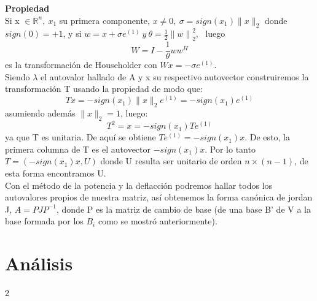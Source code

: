 \documentclass[12pt,a4paper]{article}
\begin{document}
\begin{multicols}{2}
\noindent\textbf{Propiedad}\\
\noindent Si x $\in\mathbb{R}^n, \ x_{1}$ su primera componente, $x\neq 0,\ \sigma=sign(x_{1})\|x\|_{2}$ donde $sign(0)=+1$, y si $w=x+\sigma e^{(1)} \ y \ \theta=\frac{1}{2}{\|w\|}^{2}_{2}$, \ luego $$W=I-\frac{1}{\theta}ww^{H}$$ es la transformación de Householder con $Wx=-\sigma e^{(1)}$.\\
Siendo $\lambda$ el autovalor hallado de A y x su respectivo autovector construiremos la transformación T usando la propiedad de modo que:  $$Tx=-sign(x_{1})\|x\|_{2}e^{(1)}=-sign(x_{1})e^{(1)}$$ asumiendo además $\|x\|_{2}=1$, luego:\\
$$T^{2}=x=-sign(x_{1})Te^{(1)}$$ya que T es unitaria. De aquí se obtiene $Te^{(1)}=-sign(x_{1})x$. De esto, la primera columna de T es el autovector $-sign(x_{1})x$. Por lo tanto $T=(-sign(x_{1})x,U)$ donde U resulta ser unitario de orden $n\times(n-1)$, de esta forma encontramos U. \\

\noindent Con el método de la potencia y la deflacción podremos hallar todos los autovalores propios de nuestra matriz, así obtenemos la forma canónica de jordan J, $A=PJP^{-1}$, donde P es la matriz de cambio de base (de una base B' de V a la base formada por los $B_{i}$ como se mostró anteriormente).\\


\section{Análisis}


\end{multicols}{2}
\end{document}
